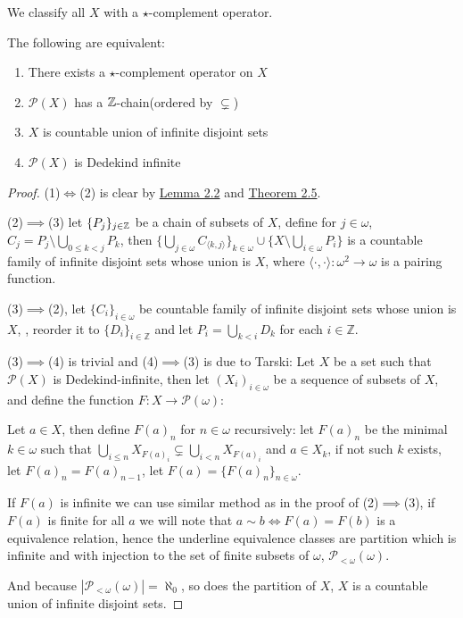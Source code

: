 	We classify all $X$ with a $\star$-complement operator.
	
	\begin{theorem}\label{thm:2.7}
		The following are equivalent:
		\begin{enumerate}
			\item{ There exists a $\star$-complement operator on $X$}
			\item{ $\mathcal{P}(X)$ has a $\Bbb{Z}$-chain(ordered by $\subsetneq$)}
			\item{ $X$ is countable union of infinite disjoint sets}
			\item{ $\mathcal{P}(X)$ is Dedekind infinite}
		\end{enumerate}
	\end{theorem}
	\begin{proof}
		(1)$\iff$(2) is clear by \hyperref[lem:2.2]{Lemma 2.2} and \hyperref[thm:2.5]{Theorem 2.5}.
		
		(2)$\implies$(3) let $\{P_j\}_{j\in\Bbb{Z}}$ be a chain of subsets of $X$, define for $j\in\omega$, $C_j=P_j\setminus\bigcup_{0\le k<j}P_k$, then $\{\bigcup_{j\in\omega}C_{\langle k,j\rangle}\}_{k\in\omega}\cup\{X\setminus\bigcup_{i\in \omega}P_i\}$ is a countable family of infinite disjoint sets whose union is $X$, where $\langle\cdot,\cdot\rangle:\omega^2\to\omega$ is a pairing function.
		
		(3)$\implies$(2), let $\{C_i\}_{i\in \omega}$ be countable family of infinite disjoint sets whose union is $X$, , reorder it to $\{D_i\}_{i\in\mathbb Z}$ and let $P_i=\bigcup_{k<i}D_k$ for each $i\in\mathbb Z$.
		
		(3)$\implies$(4) is trivial and (4)$\implies$(3) is due to Tarski\cite{SurLesEnsemblesFinis}:
		Let $X$ be a set such that $\mathcal{P}(X)$ is Dedekind-infinite, then let $(X_i)_{i\in\omega}$ be a sequence of subsets of $X$, and define the function $F:X\to\mathcal{P}(\omega)$:
		
		Let $a\in X$, then define $F(a)_n$ for $n\in\omega$ recursively: let $F(a)_n$ be the minimal $k\in\omega$ such that $\bigcup_{i\le n} X_{F(a)_i}\subsetneq \bigcup_{i< n} X_{F(a)_i}$ and $a\in X_k$, if not such $k$ exists, let $F(a)_n=F(a)_{n-1}$, let $F(a)=\{F(a)_n\}_{n\in\omega}$.
		
		If $F(a)$ is infinite we can use similar method as in the proof of (2)$\implies$(3), if $F(a)$ is finite for all $a$ we will note that $a\sim b\iff F(a)=F(b)$ is a equivalence relation, hence the underline equivalence classes are partition which is infinite and with injection to the set of finite subsets of $\omega$, $\mathcal{P}_{<\omega}(\omega)$.
		
		And because $|\mathcal{P}_{<\omega}(\omega)|=\aleph_0$, so does the partition of $X$, $X$ is a countable union of infinite disjoint sets.
	\end{proof}
	
